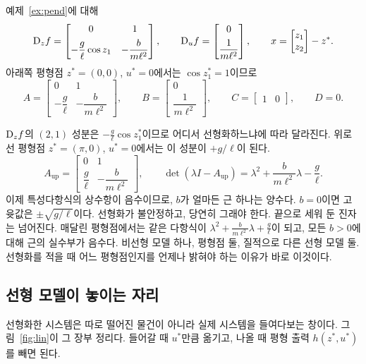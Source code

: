 \documentclass[11pt]{article}
\begin{document}
\begin{example}[진자, 이어서]
예제~\ref{ex:pend}에 대해
\[
   \mathrm{D}_{z}f = \begin{bmatrix} 0 & 1\\[4pt]
     -\dfrac{g}{\ell}\cos z_1 & -\dfrac{b}{m\ell^{2}}\end{bmatrix},
   \qquad
   \mathrm{D}_{u}f = \begin{bmatrix}0\\[4pt] \dfrac{1}{m\ell^{2}}\end{bmatrix},
   \qquad
   x = \begin{bmatrix}z_1\\ z_2\end{bmatrix} - z^{*} .
\]
아래쪽 평형점 $z^{*}=(0,0)$, $u^{*}=0$에서는 $\cos z_1^{*}=1$이므로
\[
   A = \begin{bmatrix}0&1\\[3pt] -\dfrac{g}{\ell} & -\dfrac{b}{m\ell^{2}}\end{bmatrix},
   \qquad
   B = \begin{bmatrix}0\\[3pt] \dfrac{1}{m\ell^{2}}\end{bmatrix},
   \qquad C=\begin{bmatrix}1&0\end{bmatrix},\qquad D=0 .
\]
\end{example}

\begin{example}[진자, 위로 선 평형점]\label{ex:pendup}
$\mathrm{D}_z f$의 $(2,1)$ 성분은 $-\frac{g}{\ell}\cos z_1^{*}$이므로 어디서
선형화하느냐에 따라 달라진다. 위로 선 평형점 $z^{*}=(\pi,0)$, $u^{*}=0$에서는
이 성분이 $+g/\ell$이 된다.
\[
   A_{\text{up}} = \begin{bmatrix}0&1\\[3pt] \dfrac{g}{\ell} & -\dfrac{b}{m\ell^{2}}\end{bmatrix},
   \qquad
   \det(\lambda I-A_{\text{up}}) = \lambda^{2}+\frac{b}{m\ell^{2}}\lambda-\frac{g}{\ell}.
\]
이제 특성다항식의 상수항이 음수이므로, $b$가 얼마든 근 하나는 양수다. $b=0$이면
고윳값은 $\pm\sqrt{g/\ell}$이다. 선형화가 불안정하고, 당연히 그래야 한다. 끝으로
세워 둔 진자는 넘어진다. 매달린 평형점에서는 같은 다항식이
$\lambda^{2}+\frac{b}{m\ell^{2}}\lambda+\frac{g}{\ell}$이 되고, 모든 $b>0$에 대해
근의 실수부가 음수다. 비선형 모델 하나, 평형점 둘, 질적으로 다른 선형 모델 둘.
선형화를 적을 때 어느 평형점인지를 언제나 밝혀야 하는 이유가 바로 이것이다.
\end{example}

\subsection{선형 모델이 놓이는 자리}
선형화한 시스템은 따로 떨어진 물건이 아니라 실제 시스템을 들여다보는 창이다.
그림~\ref{fig:lin}이 그 장부 정리다. 들어갈 때 $u^{*}$만큼 옮기고, 나올 때
평형 출력 $h(z^{*},u^{*})$를 빼면 된다.
\end{document}
